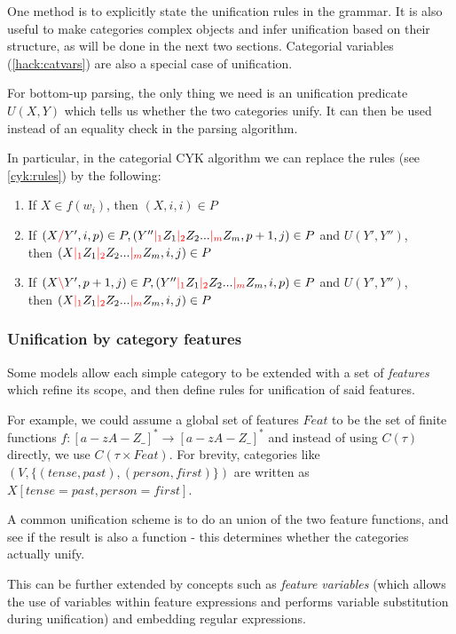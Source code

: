 \documentclass[main.tex]{subfiles}
\begin{document}
One method is to explicitly state the unification rules in the grammar.
It is also useful to make categories complex objects and infer unification
based on their structure, as will be done in the next two sections. Categorial
variables (\cref{hack:catvars}) are also a special case of unification.

For bottom-up parsing, the only thing we need is an unification predicate
$U(X, Y)$ which tells us whether the two categories unify. It can then be
used instead of an equality check in the parsing algorithm.

In particular, in the categorial CYK algorithm we can replace the rules (see \cref{cyk:rules})
by the following:

\begin{enumerate}
    \item If $X \in f(w_i)$, then $(X, i, i) \in P$
    \item If $(X \textcolor{red}{/} Y', i, p) \in P, (Y'' \textcolor{red}{|_{1}} Z_1 \textcolor{red}{|_{2}} Z_2 ... \textcolor{red}{|_{m}} Z_m, p + 1, j) \in P$
        and $U(Y', Y'')$, \\
        then $(X \textcolor{red}{|_{1}} Z_1 \textcolor{red}{|_{2}} Z_2 ... \textcolor{red}{|_{m}} Z_m, i, j) \in P$
    \item If $(X \textcolor{red}{\backslash} Y', p + 1, j) \in P, (Y'' \textcolor{red}{|_{1}} Z_1 \textcolor{red}{|_{2}} Z_2 ... \textcolor{red}{|_{m}} Z_m, i, p) \in P$
        and $U(Y', Y'')$, \\
        then $(X \textcolor{red}{|_{1}} Z_1 \textcolor{red}{|_{2}} Z_2 ... \textcolor{red}{|_{m}} Z_m, i, j) \in P$
\end{enumerate}

\subsubsection{Unification by category features}
Some models allow each simple category to be extended with a set of \emph{features}
which refine its scope, and then define rules for unification of said features.

For example, we could assume a global set of features $Feat$ to be the
set of finite functions $f: [a-zA-Z\_]^* \rightarrow [a-zA-Z\_]^*$
and instead of using $C(\tau)$ directly, we use $C(\tau \times Feat)$.
For brevity, categories like $(V, \{ (tense, past), (person, first) \})$
are written as $X[tense=past, person=first]$.

A common unification scheme is to do an union of the two feature functions,
and see if the result is also a function - this determines whether the
categories actually unify.

This can be further extended by concepts such as \emph{feature variables}
(which allows the use of variables within feature expressions and
performs variable substitution during unification) and embedding regular expressions.
\end{document}
